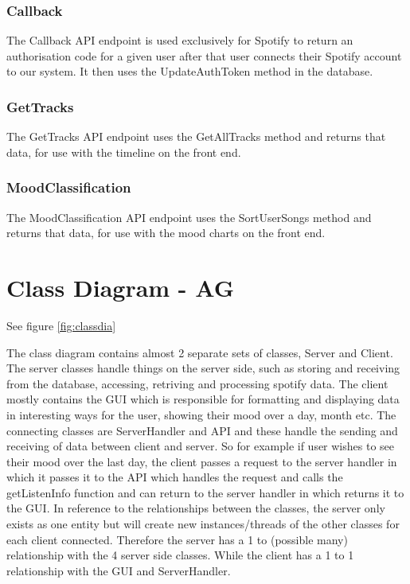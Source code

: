 \documentclass[10pt, notitlepage]{report}
\begin{document}
\subsubsection{Callback}
The Callback API endpoint is used exclusively for Spotify to return an authorisation code for a given user after that user connects their Spotify account to our system. It then uses the UpdateAuthToken method in the database.

\subsubsection{GetTracks}
The GetTracks API endpoint uses the GetAllTracks method and returns that data, for use with the timeline on the front end.

\subsubsection{MoodClassification}
The MoodClassification API endpoint uses the SortUserSongs method and returns that data, for use with the mood charts on the front end.

\section{Class Diagram - AG}

See figure \ref{fig:classdia}

The class diagram contains almost 2 separate sets of classes, Server and Client. The server classes handle things on the server side, such as storing and receiving from the database, accessing, retriving and processing spotify data. The client mostly contains the GUI which is responsible for formatting and displaying data in interesting ways for the user, showing their mood over a day, month etc. The connecting classes are ServerHandler and API and these handle the sending and receiving of data between client and server. So for example if user wishes to see their mood over the last day, the client passes a request to the server handler in which it passes it to the API which handles the request and calls the getListenInfo function and can return to the server handler in which returns it to the GUI. In reference to the relationships between the classes, the server only exists as one entity but will create new instances/threads of the other classes for each client connected. Therefore the server has a 1 to (possible many) relationship with the 4 server side classes. While the client has a 1 to 1 relationship with the GUI and ServerHandler.
\end{document}
